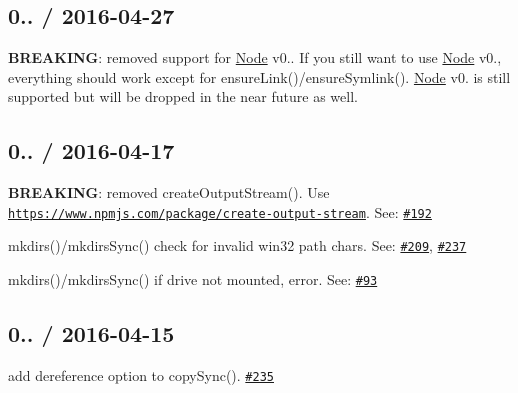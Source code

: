 \subsection*{0.. / 2016-\/04-\/27 }


\begin{DoxyItemize}
\item {\bfseries B\+R\+E\+A\+K\+I\+NG}\+: removed support for \mbox{\hyperlink{classNode}{Node}} v0.. If you still want to use \mbox{\hyperlink{classNode}{Node}} v0., everything should work except for {\ttfamily ensure\+Link()/ensure\+Symlink()}. \mbox{\hyperlink{classNode}{Node}} v0. is still supported but will be dropped in the near future as well.
\end{DoxyItemize}

\subsection*{0.. / 2016-\/04-\/17 }


\begin{DoxyItemize}
\item {\bfseries B\+R\+E\+A\+K\+I\+NG}\+: removed {\ttfamily create\+Output\+Stream()}. Use \href{https://www.npmjs.com/package/create-output-stream}{\tt https\+://www.\+npmjs.\+com/package/create-\/output-\/stream}. See\+: \href{https://github.com/jprichardson/node-fs-extra/issues/192}{\tt \#192}
\item {\ttfamily mkdirs()/mkdirs\+Sync()} check for invalid win32 path chars. See\+: \href{https://github.com/jprichardson/node-fs-extra/issues/209}{\tt \#209}, \href{https://github.com/jprichardson/node-fs-extra/issues/237}{\tt \#237}
\item {\ttfamily mkdirs()/mkdirs\+Sync()} if drive not mounted, error. See\+: \href{https://github.com/jprichardson/node-fs-extra/issues/93}{\tt \#93}
\end{DoxyItemize}

\subsection*{0.. / 2016-\/04-\/15 }


\begin{DoxyItemize}
\item add {\ttfamily dereference} option to {\ttfamily copy\+Sync()}. \href{https://github.com/jprichardson/node-fs-extra/pull/235}{\tt \#235}
\end{DoxyItemize}

